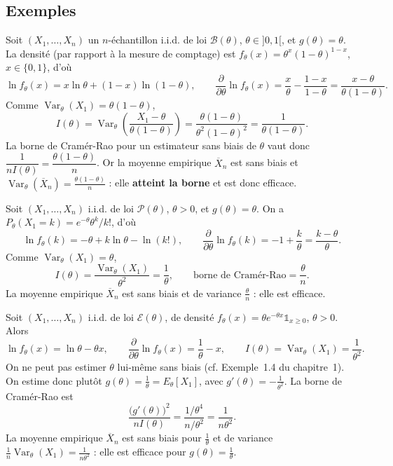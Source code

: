 \subsection*{Exemples}

\begin{exemple}
Soit $(X_1, \dots, X_n)$ un $n$-échantillon i.i.d. de loi $\mathcal{B}(\theta)$,
$\theta \in {]0,1[}$, et $g(\theta) = \theta$. La densité (par rapport à la mesure
de comptage) est $f_\theta(x) = \theta^{x}(1-\theta)^{1-x}$, $x \in \{0,1\}$, d'où
\[
  \ln f_\theta(x) = x \ln\theta + (1-x)\ln(1-\theta),
  \qquad
  \frac{\partial}{\partial\theta} \ln f_\theta(x)
  = \frac{x}{\theta} - \frac{1-x}{1-\theta}
  = \frac{x - \theta}{\theta(1-\theta)}.
\]
Comme $\operatorname{Var}_\theta(X_1) = \theta(1-\theta)$,
\[
  I(\theta)
  = \operatorname{Var}_\theta\!\left( \frac{X_1 - \theta}{\theta(1-\theta)} \right)
  = \frac{\theta(1-\theta)}{\theta^{2}(1-\theta)^{2}}
  = \frac{1}{\theta(1-\theta)}.
\]
La borne de Cramér-Rao pour un estimateur sans biais de $\theta$ vaut donc
$\dfrac{1}{n I(\theta)} = \dfrac{\theta(1-\theta)}{n}$. Or la moyenne empirique
$\overline{X}_n$ est sans biais et $\operatorname{Var}_\theta(\overline{X}_n) =
\frac{\theta(1-\theta)}{n}$ : elle \textbf{atteint la borne} et est donc efficace.
\end{exemple}

\begin{exemple}
Soit $(X_1, \dots, X_n)$ i.i.d. de loi $\mathcal{P}(\theta)$, $\theta > 0$, et
$g(\theta) = \theta$. On a $P_\theta(X_1 = k) = e^{-\theta}\theta^{k}/k!$, d'où
\[
  \ln f_\theta(k) = -\theta + k\ln\theta - \ln(k!),
  \qquad
  \frac{\partial}{\partial\theta} \ln f_\theta(k) = -1 + \frac{k}{\theta}
  = \frac{k - \theta}{\theta}.
\]
Comme $\operatorname{Var}_\theta(X_1) = \theta$,
\[
  I(\theta) = \frac{\operatorname{Var}_\theta(X_1)}{\theta^{2}} = \frac{1}{\theta},
  \qquad\text{borne de Cramér-Rao} = \frac{\theta}{n}.
\]
La moyenne empirique $\overline{X}_n$ est sans biais et de variance
$\frac{\theta}{n}$ : elle est efficace.
\end{exemple}

\begin{exemple}
Soit $(X_1, \dots, X_n)$ i.i.d. de loi $\mathcal{E}(\theta)$, de densité
$f_\theta(x) = \theta e^{-\theta x}\mathbb{1}_{x \geq 0}$, $\theta > 0$. Alors
\[
  \ln f_\theta(x) = \ln\theta - \theta x,
  \qquad
  \frac{\partial}{\partial\theta} \ln f_\theta(x) = \frac{1}{\theta} - x,
  \qquad
  I(\theta) = \operatorname{Var}_\theta(X_1) = \frac{1}{\theta^{2}}.
\]
On ne peut pas estimer $\theta$ lui-même sans biais (cf. Exemple~1.4 du
chapitre~1). On estime donc plutôt $g(\theta) = \tfrac{1}{\theta} = E_\theta[X_1]$,
avec $g'(\theta) = -\tfrac{1}{\theta^{2}}$. La borne de Cramér-Rao est
\[
  \frac{\bigl(g'(\theta)\bigr)^{2}}{n I(\theta)}
  = \frac{1/\theta^{4}}{n/\theta^{2}} = \frac{1}{n\theta^{2}}.
\]
La moyenne empirique $\overline{X}_n$ est sans biais pour $\tfrac{1}{\theta}$ et de
variance $\frac{1}{n}\operatorname{Var}_\theta(X_1) = \frac{1}{n\theta^{2}}$ : elle
est efficace pour $g(\theta) = \tfrac{1}{\theta}$.
\end{exemple}

